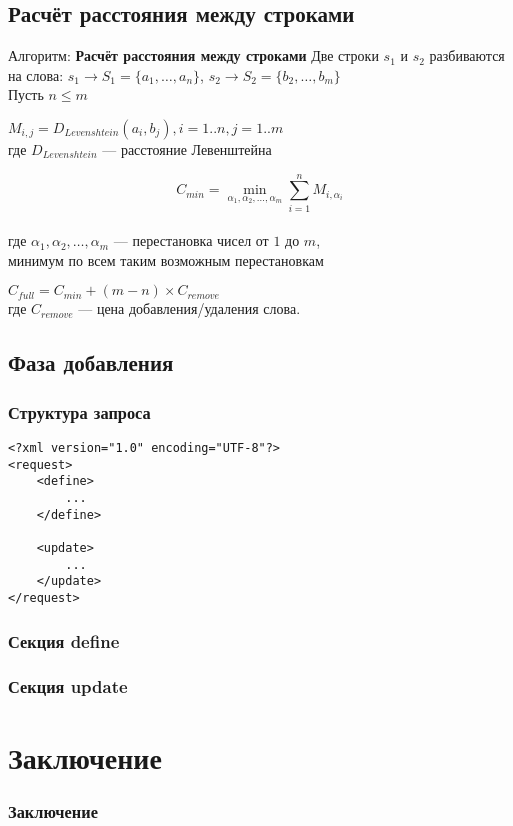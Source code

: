 \documentclass[utf8,handout]{beamer}
\begin{document}
	\subsection{Расчёт расстояния между строками}
	\begin{frame}
 		\begin{block}{Алгоритм: \textbf{Расчёт расстояния между строками}}
 			Две строки $s_{1}$ и $s_{2}$ разбиваются на слова:
 			$s_{1}\rightarrow S_{1}=\lbrace a_{1},\ldots,a_{n}\rbrace$, $s_{2}\rightarrow S_{2}=\lbrace b_{2},\ldots,b_{m}\rbrace$ \\
 			Пусть $n\leq m$

			$ M_{i,j} = D_{Levenshtein}(a_{i},b_{j}), i=1..n, j=1..m $ \\
			где $D_{Levenshtein}$ --- расстояние Левенштейна
			
			\[	C_{min}=\min_{\alpha_1, \alpha_2, \ldots, \alpha_m}{\sum_{i=1}^{n} M_{i,\alpha_{i}}} \] \\
			где $\alpha_1, \alpha_2, \ldots, \alpha_m$ --- перестановка чисел от $1$ до $m$,\\
			минимум по всем таким возможным перестановкам

			$C_{full}=C_{min}+(m-n)\times C_{remove}$\\
			где $C_{remove}$ --- цена добавления/удаления слова.
		\end{block}
	\end{frame}

	\subsection{Фаза добавления}
		\begin{frame}[fragile]
 			\frametitle{Структура запроса}
 			\begin{verbatim}
<?xml version="1.0" encoding="UTF-8"?>
<request>
    <define>
        ...
    </define>

    <update>
        ...
    </update>
</request>
			\end{verbatim}
		\end{frame}
	
		\begin{frame}
 			\frametitle{Секция define}
		\end{frame}
	
		\begin{frame}
 			\frametitle{Секция update}
		\end{frame}
	
\section{Заключение}
	\begin{frame}
		\frametitle{Заключение}
	\end{frame}
	
\end{document}
